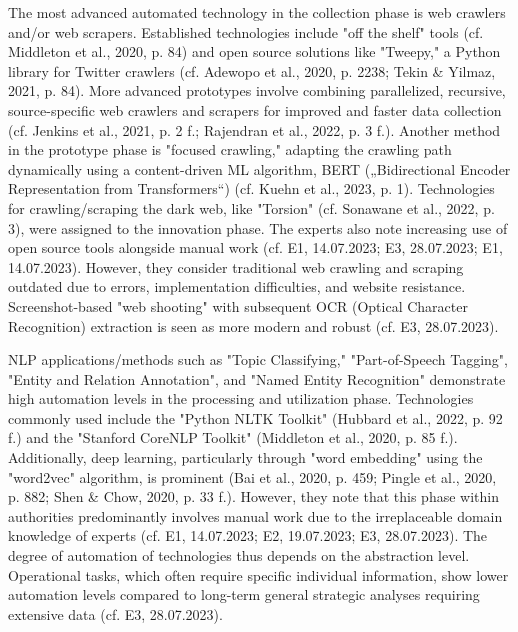\documentclass[10pt]{article}
\begin{document}
The most advanced automated technology in the collection phase is web crawlers and/or web scrapers.
Established technologies include "off the shelf" tools (cf. Middleton et al., 2020, p. 84) and open source
solutions like "Tweepy," a Python library for Twitter crawlers (cf. Adewopo et al., 2020, p. 2238; Tekin & Yilmaz, 2021, p. 84).
More advanced prototypes involve combining parallelized, recursive, source-specific web crawlers and scrapers for improved and
faster data collection (cf. Jenkins et al., 2021, p. 2 f.; Rajendran et al., 2022, p. 3 f.). Another method in the prototype phase is
"focused crawling," adapting the crawling path dynamically using a content-driven ML algorithm, BERT („Bidirectional Encoder Representation from Transformers“)
(cf. Kuehn et al., 2023, p. 1). Technologies for crawling/scraping the dark web, like "Torsion" (cf. Sonawane et al., 2022, p. 3),
were assigned to the innovation phase. The experts also note increasing use of open source tools alongside manual work
(cf. E1, 14.07.2023; E3, 28.07.2023; E1, 14.07.2023). However, they consider traditional web crawling and scraping
outdated due to errors, implementation difficulties, and website resistance. Screenshot-based "web shooting" with
subsequent OCR (Optical Character Recognition) extraction is seen as more modern and robust (cf. E3, 28.07.2023).

NLP applications/methods such as "Topic Classifying," "Part-of-Speech Tagging", "Entity and Relation Annotation", and "Named Entity Recognition"
demonstrate high automation levels in the processing and utilization phase. Technologies commonly used include
the "Python NLTK Toolkit" (Hubbard et al., 2022, p. 92 f.) and the "Stanford CoreNLP Toolkit" (Middleton et al., 2020, p. 85 f.).
Additionally, deep learning, particularly through "word embedding" using the "word2vec" algorithm, is prominent
(Bai et al., 2020, p. 459; Pingle et al., 2020, p. 882; Shen & Chow, 2020, p. 33 f.). However, they note that
this phase within authorities predominantly involves manual work due to the irreplaceable domain knowledge of experts
(cf. E1, 14.07.2023; E2, 19.07.2023; E3, 28.07.2023). The degree of automation of technologies thus depends on the abstraction level.
Operational tasks, which often require specific individual information, show lower automation levels compared to long-term general strategic analyses
requiring extensive data (cf. E3, 28.07.2023).
\end{document}

